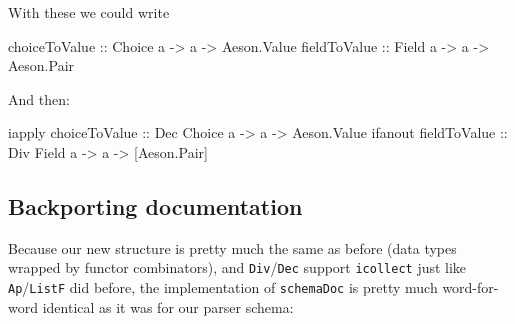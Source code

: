 \documentclass[]{article}
\newenvironment{Shaded}{}{}
\newcommand{\DataTypeTok}[1]{\textcolor[rgb]{0.56,0.13,0.00}{#1}}
\newcommand{\NormalTok}[1]{#1}
\newcommand{\OtherTok}[1]{\textcolor[rgb]{0.00,0.44,0.13}{#1}}
\begin{document}
With these we could write

\begin{Shaded}
\begin{Highlighting}[]
\OtherTok{choiceToValue ::} \DataTypeTok{Choice}\NormalTok{ a }\OtherTok{{-}>}\NormalTok{ a }\OtherTok{{-}>} \DataTypeTok{Aeson.Value}
\OtherTok{fieldToValue  ::} \DataTypeTok{Field}\NormalTok{ a  }\OtherTok{{-}>}\NormalTok{ a }\OtherTok{{-}>} \DataTypeTok{Aeson.Pair}
\end{Highlighting}
\end{Shaded}

And then:

\begin{Shaded}
\begin{Highlighting}[]
\NormalTok{iapply}\OtherTok{ choiceToValue ::} \DataTypeTok{Dec} \DataTypeTok{Choice}\NormalTok{ a }\OtherTok{{-}>}\NormalTok{ a }\OtherTok{{-}>} \DataTypeTok{Aeson.Value}
\NormalTok{ifanout}\OtherTok{ fieldToValue ::} \DataTypeTok{Div} \DataTypeTok{Field}\NormalTok{  a }\OtherTok{{-}>}\NormalTok{ a }\OtherTok{{-}>}\NormalTok{ [}\DataTypeTok{Aeson.Pair}\NormalTok{]}
\end{Highlighting}
\end{Shaded}

\hypertarget{backporting-documentation-1}{%
\subsection{Backporting documentation}\label{backporting-documentation-1}}

Because our new structure is pretty much the same as before (data types wrapped
by functor combinators), and \texttt{Div}/\texttt{Dec} support \texttt{icollect}
just like \texttt{Ap}/\texttt{ListF} did before, the implementation of
\texttt{schemaDoc} is pretty much word-for-word identical as it was for our
parser schema:
\end{document}
